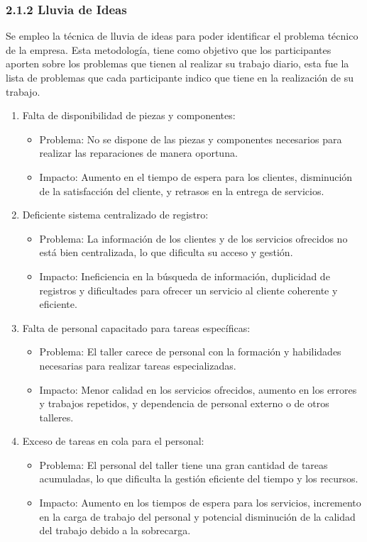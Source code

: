 \subsubsection*{2.1.2 Lluvia de Ideas}
Se empleo la técnica de lluvia de ideas para poder identificar el problema técnico de la empresa. Esta metodología, tiene como objetivo que los participantes aporten sobre los problemas que tienen al realizar su trabajo diario, esta fue la lista de problemas que cada participante indico que tiene en la realización de su trabajo.
\begin{enumerate}
    \item Falta de disponibilidad de piezas y componentes:
    \begin{itemize}
        \item Problema: No se dispone de las piezas y componentes necesarios para realizar las reparaciones de manera oportuna.
        \item Impacto: Aumento en el tiempo de espera para los clientes, disminución de la satisfacción del cliente, y retrasos en la entrega de servicios.
    \end{itemize}    

    \item Deficiente sistema centralizado de registro:
    \begin{itemize}
        \item Problema: La información de los clientes y de los servicios ofrecidos no está bien centralizada, lo que dificulta su acceso y gestión.
        \item Impacto: Ineficiencia en la búsqueda de información, duplicidad de registros y dificultades para ofrecer un servicio al cliente coherente y eficiente.
    \end{itemize}
    
    \item Falta de personal capacitado para tareas específicas:
    \begin{itemize}
        \item Problema: El taller carece de personal con la formación y habilidades necesarias para realizar tareas especializadas.
        \item Impacto: Menor calidad en los servicios ofrecidos, aumento en los errores y trabajos repetidos, y dependencia de personal externo o de otros talleres.
    \end{itemize}
    
    \item Exceso de tareas en cola para el personal:
    \begin{itemize}
        \item Problema: El personal del taller tiene una gran cantidad de tareas acumuladas, lo que dificulta la gestión eficiente del tiempo y los recursos.
        \item Impacto: Aumento en los tiempos de espera para los servicios, incremento en la carga de trabajo del personal y potencial disminución de la calidad del trabajo debido a la sobrecarga.
    \end{itemize}


\end{enumerate}
